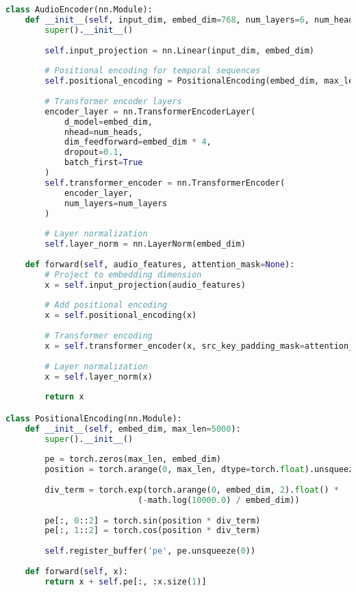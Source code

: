 \begin{lstlisting}[language=Python, caption=Audio encoder for generating audio tokens]
class AudioEncoder(nn.Module):
    def __init__(self, input_dim, embed_dim=768, num_layers=6, num_heads=8):
        super().__init__()
        
        self.input_projection = nn.Linear(input_dim, embed_dim)
        
        # Positional encoding for temporal sequences
        self.positional_encoding = PositionalEncoding(embed_dim, max_len=2000)
        
        # Transformer encoder layers
        encoder_layer = nn.TransformerEncoderLayer(
            d_model=embed_dim,
            nhead=num_heads,
            dim_feedforward=embed_dim * 4,
            dropout=0.1,
            batch_first=True
        )
        self.transformer_encoder = nn.TransformerEncoder(
            encoder_layer, 
            num_layers=num_layers
        )
        
        # Layer normalization
        self.layer_norm = nn.LayerNorm(embed_dim)
        
    def forward(self, audio_features, attention_mask=None):
        # Project to embedding dimension
        x = self.input_projection(audio_features)
        
        # Add positional encoding
        x = self.positional_encoding(x)
        
        # Transformer encoding
        x = self.transformer_encoder(x, src_key_padding_mask=attention_mask)
        
        # Layer normalization
        x = self.layer_norm(x)
        
        return x

class PositionalEncoding(nn.Module):
    def __init__(self, embed_dim, max_len=5000):
        super().__init__()
        
        pe = torch.zeros(max_len, embed_dim)
        position = torch.arange(0, max_len, dtype=torch.float).unsqueeze(1)
        
        div_term = torch.exp(torch.arange(0, embed_dim, 2).float() * 
                           (-math.log(10000.0) / embed_dim))
        
        pe[:, 0::2] = torch.sin(position * div_term)
        pe[:, 1::2] = torch.cos(position * div_term)
        
        self.register_buffer('pe', pe.unsqueeze(0))
    
    def forward(self, x):
        return x + self.pe[:, :x.size(1)]
\end{lstlisting}

